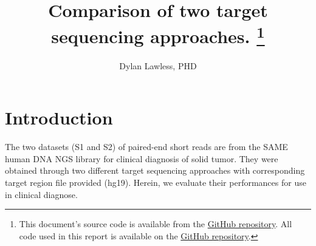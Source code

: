 \documentclass{article}
\begin{document}
\date{} %
\title{\Large \bf Comparison of two target sequencing approaches.
\footnote{This document's source code is available from the 
\href{https://github.com/DylanLawless/kit_assess}{GitHub repository}.
All code used in this report is available on the 
\href{https://github.com/DylanLawless/kit_assess}{GitHub repository}.}
}

\author[1]{\rm Dylan Lawless, PHD}
\maketitle


\section{Introduction}
\label{intro}
The two datasets (S1 and S2) of paired-end short reads are from the SAME human DNA NGS library for clinical diagnosis of solid tumor. 
They were obtained through two different target sequencing approaches with corresponding target region file provided (hg19). 
Herein, we evaluate their performances for use in clinical diagnose.
\end{document}
